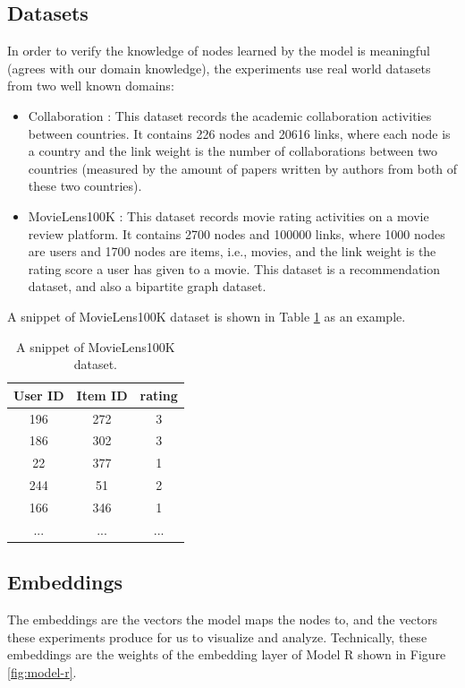 \documentclass[conference]{IEEEtran}
\begin{document}
\subsection{Datasets}
In order to verify the knowledge of nodes learned by the model is meaningful (agrees with our domain knowledge), the experiments use real world datasets from two well known domains:
\begin{itemize}
	\item Collaboration \cite{pan2012world}: This dataset records the academic collaboration activities between countries.
	It contains 226 nodes and 20616 links, where each node is a country and the link weight is the number of collaborations between two countries (measured by the amount of papers written by authors from both of these two countries).
	\item MovieLens100K \cite{harper2015movielens}: This dataset records movie rating activities on a movie review platform.
	It contains 2700 nodes and 100000 links, where 1000 nodes are users and 1700 nodes are items, i.e., movies, and the link weight is the rating score a user has given to a movie.
	This dataset is a recommendation dataset, and also a bipartite graph dataset.
\end{itemize}
A snippet of MovieLens100K dataset is shown in Table \ref{tab:movielens100k} as an example.
\begin{table}[!ht]
	\centering
	\caption{A snippet of MovieLens100K dataset.}
	\begin{tabular}{ccc}  \hline \rowcolor{blue!30}
		User ID & Item ID & rating \\ \hline
		196 & 272 & 3 \\ \hline
		186 & 302 & 3 \\ \hline
		22 & 377 & 1 \\ \hline
		244 & 51 & 2 \\ \hline
		166 & 346 & 1 \\ \hline
		... & ... & ... \\ \hline
	\end{tabular}
	\label{tab:movielens100k}
\end{table}

\subsection{Embeddings}
The embeddings are the vectors the model maps the nodes to, and the vectors these experiments produce for us to visualize and analyze.
Technically, these embeddings are the weights of the embedding layer of Model R shown in Figure \ref{fig:model-r}.
\end{document}
